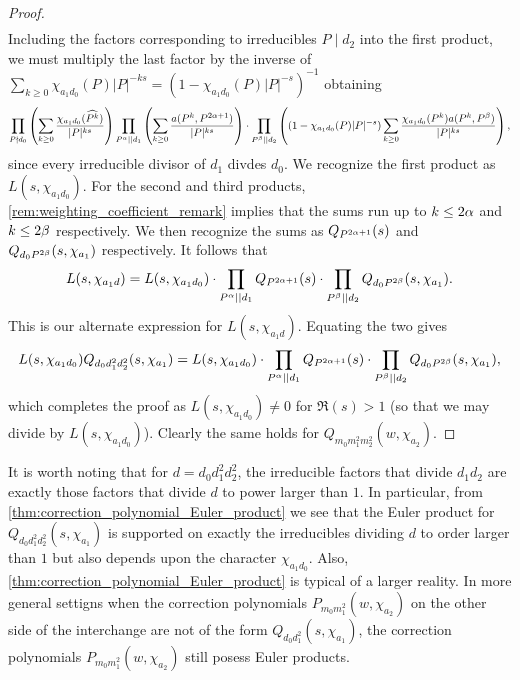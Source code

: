 \documentclass[12pt,reqno,oneside]{amsart}
\begin{document}
\begin{proof}
\begin{align*}
        \end{align*}
        Including the factors corresponding to irreducibles $P \mid d_{2}$ into the first product, we must multiply the last factor by the inverse of $\sum_{k \ge 0}\chi_{a_{1}d_{0}}(P)|P|^{-ks} = (1-\chi_{a_{1}d_{0}}(P)|P|^{-s})^{-1}$ obtaining
        \[
            \prod_{P \nmid d_{0}}\left(\sum_{k \ge 0}\frac{\chi_{a_{1}d_{0}}(\widehat{P^{k}})}{|P|^{ks}}\right)\prod_{P^{\alpha} \mid\mid d_{1}}\left(\sum_{k \ge 0}\frac{a(P^{k},P^{2\alpha+1})}{|P|^{ks}}\right) \cdot \prod_{P^{\beta} \mid\mid d_{2}}\left((1-\chi_{a_{1}d_{0}}(P)|P|^{-s})\sum_{k \ge 0}\frac{\chi_{a_{1}d_{0}}(P^{k})a(P^{k},P^{\beta})}{|P|^{ks}}\right),
        \]
        since every irreducible divisor of $d_{1}$ divdes $d_{0}$. We recognize the first product as $L(s,\chi_{a_{1}d_{0}})$. For the second and third products, \cref{rem:weighting_coefficient_remark} implies that the sums run up to $k \le 2\alpha$ and $k \le 2\beta$ respectively. We then recognize the sums as $Q_{P^{2\alpha+1}}(s)$ and $Q_{d_{0}P^{2\beta}}(s,\chi_{a_{1}})$ respectively. It follows that
        \[
            L(s,\chi_{a_{1}d}) = L(s,\chi_{a_{1}d_{0}}) \cdot \prod_{P^{\alpha} \mid\mid d_{1}}Q_{P^{2\alpha+1}}(s) \cdot \prod_{P^{\beta} \mid\mid d_{2}}Q_{d_{0}P^{2\beta}}(s,\chi_{a_{1}}).
        \]
        This is our alternate expression for $L(s,\chi_{a_{1}d})$. Equating the two gives
        \[
            L(s,\chi_{a_{1}d_{0}})Q_{d_{0}d_{1}^{2}d_{2}^{2}}(s,\chi_{a_{1}}) = L(s,\chi_{a_{1}d_{0}}) \cdot \prod_{P^{\alpha} \mid\mid d_{1}}Q_{P^{2\alpha+1}}(s) \cdot \prod_{P^{\beta} \mid\mid d_{2}}Q_{d_{0}P^{2\beta}}(s,\chi_{a_{1}}),
        \]
        which completes the proof as $L(s,\chi_{a_{1}d_{0}}) \neq 0$ for $\Re(s) > 1$ (so that we may divide by $L(s,\chi_{a_{1}d_{0}})$). Clearly the same holds for $Q_{m_{0}m_{1}^{2}m_{2}^{2}}(w,\chi_{a_{2}})$.
    \end{proof}

    It is worth noting that for $d = d_{0}d_{1}^{2}d_{2}^{2}$, the irreducible factors that divide $d_{1}d_{2}$ are exactly those factors that divide $d$ to power larger than $1$. In particular, from \cref{thm:correction_polynomial_Euler_product} we see that the Euler product for $Q_{d_{0}d_{1}^{2}d_{2}^{2}}(s,\chi_{a_{1}})$ is supported on exactly the irreducibles dividing $d$ to order larger than $1$ but also depends upon the character $\chi_{a_{1}d_{0}}$. Also, \cref{thm:correction_polynomial_Euler_product} is typical of a larger reality. In more general settigns when the correction polynomials $P_{m_{0}m_{1}^{2}}(w,\chi_{a_{2}})$ on the other side of the interchange are not of the form $Q_{d_{0}d_{1}^{2}}(s,\chi_{a_{1}})$, the correction polynomials $P_{m_{0}m_{1}^{2}}(w,\chi_{a_{2}})$ still posess Euler products.
\end{document}
